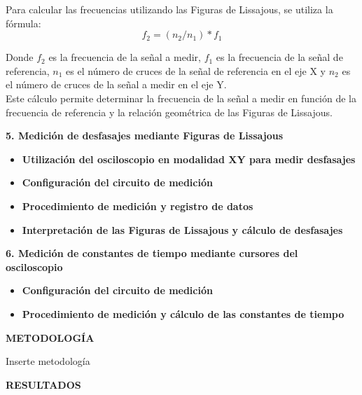 \documentclass[12pt]{article}
\begin{document}
\begin{itemize}
		Para calcular las frecuencias utilizando las Figuras de Lissajous, se utiliza la fórmula: $$f_{2} = (n_{2}/n_{1}) * f_{1}$$
		
		Donde $f_{2}$ es la frecuencia de la señal a medir, $f_{1}$ es la frecuencia de la señal de referencia, $n_{1}$ es el número de cruces de la señal de referencia en el eje X y $n_{2}$ es el número de cruces de la señal a medir en el eje Y.\\
		
		Este cálculo permite determinar la frecuencia de la señal a medir en función de la frecuencia de referencia y la relación geométrica de las Figuras de Lissajous.
		
	\end{itemize}
	
	
	\textbf{5. Medición de desfasajes mediante Figuras de Lissajous}\\
	
	\begin{itemize}
		\item \textbf{Utilización del osciloscopio en modalidad XY para medir desfasajes}
		\item \textbf{Configuración del circuito de medición}
		\item \textbf{Procedimiento de medición y registro de datos}
		\item \textbf{Interpretación de las Figuras de Lissajous y cálculo de desfasajes}
	\end{itemize}
	
	
	\textbf{6. Medición de constantes de tiempo mediante cursores del osciloscopio}\\
	
	\begin{itemize}
		
		\item \textbf{Configuración del circuito de medición}
		\item \textbf{Procedimiento de medición y cálculo de las constantes de tiempo}
		
	\end{itemize}

	\newpage
	
	\begin{center}
		\textbf{\large METODOLOGÍA}\\
	\end{center}
	
	Inserte metodología
	
	\newpage
	
	\begin{center}
		\textbf{\large RESULTADOS}\\
	\end{center}
	
\end{document}
